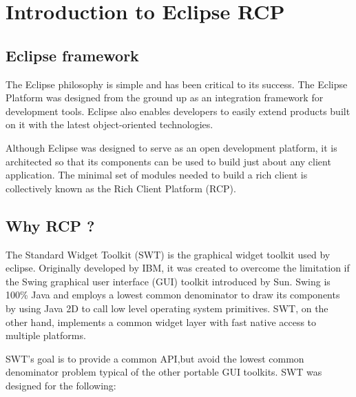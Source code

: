 
\section{Introduction to Eclipse RCP}
\subsection{Eclipse framework}

The Eclipse philosophy is simple and has been critical to its success. The Eclipse Platform was designed from the ground up as an integration framework for development tools. Eclipse also enables developers to easily extend products built on it with the latest object-oriented technologies.

Although Eclipse was designed to serve as an open development platform, it is architected so that its components can be used to build just about any client application. The minimal set of modules needed to build a rich client is collectively known as the Rich Client Platform (RCP).

\subsection{Why RCP ?}
The Standard Widget Toolkit (SWT) is the graphical widget toolkit used by eclipse. Originally developed by IBM, it was created to overcome the limitation if the Swing graphical user interface (GUI) toolkit introduced by Sun. Swing is 100\% Java and employs a lowest common denominator to draw its components by using Java 2D to call low level operating system primitives. SWT, on the other hand, implements a common widget layer with fast native access to multiple platforms.

SWT's goal is to provide a common API,but avoid the lowest common denominator problem typical of the other portable GUI toolkits. SWT was designed for the following:


